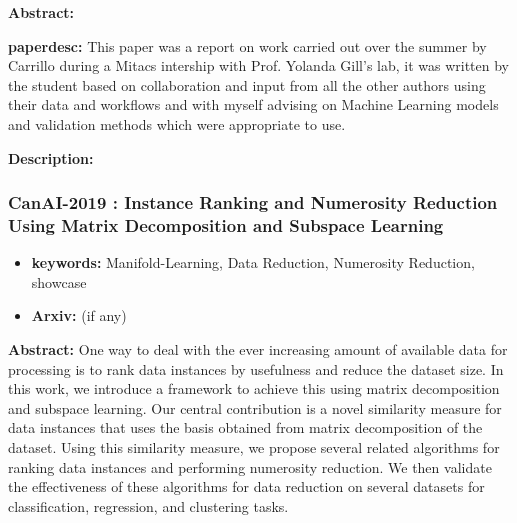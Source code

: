 \documentclass{article}
\begin{document}
\textbf{Abstract:} 

\textbf{paperdesc:} This paper was a report on work carried out over the summer by Carrillo during a Mitacs intership with Prof. Yolanda Gill's lab, it was written by the student based on collaboration and input from all the other authors using their data and workflows and with myself advising on Machine Learning models and validation methods which were appropriate to use.

\textbf{Description:} 



\newpage
\subsubsection{\textbf{CanAI-2019} : Instance Ranking and Numerosity Reduction Using Matrix Decomposition and Subspace Learning}
\begin{itemize}
\item \textbf{keywords:} Manifold-Learning, Data Reduction, Numerosity Reduction, showcase
\item \textbf{Arxiv:}  (if any)
\end{itemize}


\textbf{Abstract:} One way to deal with the ever increasing amount of available data for processing is to rank data instances by usefulness and reduce the dataset size. In this work, we introduce a framework to achieve this using matrix decomposition and subspace learning. Our central contribution is a novel similarity measure for data instances that uses the basis obtained from matrix decomposition of the dataset. Using this similarity measure, we propose several related algorithms for ranking data instances and performing numerosity reduction. We then validate the effectiveness of these algorithms for data reduction on several datasets for classification, regression, and clustering tasks.
\end{document}
